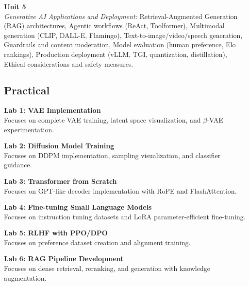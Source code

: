 \vspace{0.3cm}

\noindent\textbf{Unit 5} \\
\textit{Generative AI Applications and Deployment:} Retrieval-Augmented Generation (RAG) architectures, Agentic workflows (ReAct, Toolformer), Multimodal generation (CLIP, DALL-E, Flamingo), Text-to-image/video/speech generation, Guardrails and content moderation, Model evaluation (human preference, Elo rankings), Production deployment (vLLM, TGI, quantization, distillation), Ethical considerations and safety measures.

\newpage

\subsection*{Practical}
\noindent\textbf{Lab 1: VAE Implementation} \\
Focuses on complete VAE training, latent space visualization, and $\beta$-VAE experimentation.

\vspace{0.2cm}

\noindent\textbf{Lab 2: Diffusion Model Training} \\
Focuses on DDPM implementation, sampling visualization, and classifier guidance.

\vspace{0.2cm}

\noindent\textbf{Lab 3: Transformer from Scratch} \\
Focuses on GPT-like decoder implementation with RoPE and FlashAttention.

\vspace{0.3cm}

\noindent\textbf{Lab 4: Fine-tuning Small Language Models} \\
Focuses on instruction tuning datasets and LoRA parameter-efficient fine-tuning.

\vspace{0.2cm}

\noindent\textbf{Lab 5: RLHF with PPO/DPO} \\
Focuses on preference dataset creation and alignment training.

\vspace{0.2cm}

\noindent\textbf{Lab 6: RAG Pipeline Development} \\
Focuses on dense retrieval, reranking, and generation with knowledge augmentation.

